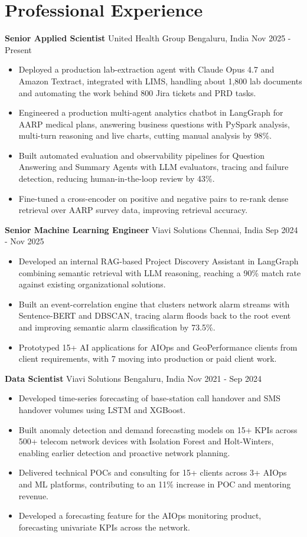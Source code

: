 \documentclass[10pt,a4paper]{article}
\newcommand{\role}[4]{\textbf{#1} \textbar{} #2 \hfill #3 \textbar{} #4\par}
\begin{document}
\section{Professional Experience}
\role{Senior Applied Scientist}{United Health Group}{Bengaluru, India}{Nov 2025 - Present}
\begin{itemize}
  \item Deployed a production lab-extraction agent with Claude Opus 4.7 and Amazon Textract, integrated with LIMS, handling about 1,800 lab documents and automating the work behind 800 Jira tickets and PRD tasks.
  \item Engineered a production multi-agent analytics chatbot in LangGraph for AARP medical plans, answering business questions with PySpark analysis, multi-turn reasoning and live charts, cutting manual analysis by 98\%.
  \item Built automated evaluation and observability pipelines for Question Answering and Summary Agents with LLM evaluators, tracing and failure detection, reducing human-in-the-loop review by 43\%.
  \item Fine-tuned a cross-encoder on positive and negative pairs to re-rank dense retrieval over AARP survey data, improving retrieval accuracy.
\end{itemize}
\vspace{3pt}
\role{Senior Machine Learning Engineer}{Viavi Solutions}{Chennai, India}{Sep 2024 - Nov 2025}
\begin{itemize}
  \item Developed an internal RAG-based Project Discovery Assistant in LangGraph combining semantic retrieval with LLM reasoning, reaching a 90\% match rate against existing organizational solutions.
  \item Built an event-correlation engine that clusters network alarm streams with Sentence-BERT and DBSCAN, tracing alarm floods back to the root event and improving semantic alarm classification by 73.5\%.
  \item Prototyped 15+ AI applications for AIOps and GeoPerformance clients from client requirements, with 7 moving into production or paid client work.
\end{itemize}
\vspace{3pt}
\role{Data Scientist}{Viavi Solutions}{Bengaluru, India}{Nov 2021 - Sep 2024}
\begin{itemize}
  \item Developed time-series forecasting of base-station call handover and SMS handover volumes using LSTM and XGBoost.
  \item Built anomaly detection and demand forecasting models on 15+ KPIs across 500+ telecom network devices with Isolation Forest and Holt-Winters, enabling earlier detection and proactive network planning.
  \item Delivered technical POCs and consulting for 15+ clients across 3+ AIOps and ML platforms, contributing to an 11\% increase in POC and mentoring revenue.
  \item Developed a forecasting feature for the AIOps monitoring product, forecasting univariate KPIs across the network.
\end{itemize}
\end{document}
